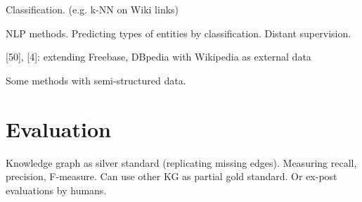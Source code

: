 Classification. (e.g. k-NN on Wiki links)

NLP methods. Predicting types of entities by classification.
Distant supervision.

[50], [4]: extending Freebase, DBpedia with Wikipedia as external data

Some methods with semi-structured data.

\section{Evaluation}

Knowledge graph as silver standard (replicating missing edges).
Measuring recall, precision, F-measure.
Can use other KG as partial gold standard.
Or ex-post evaluations by humans.
